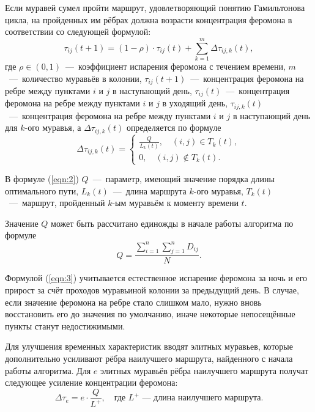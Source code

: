 Если муравей сумел пройти маршрут, удовлетворяющий понятию Гамильтонова цикла, на пройденных им рёбрах должна возрасти концентрация феромона в соответствии со следующей формулой:
\begin{equation} \label{eqn:3}
	\tau_{ij}(t + 1) = (1 - \rho) \cdot \tau_{ij}(t) + \sum_{k=1}^m \Delta\tau_{ij,k}(t),
\end{equation}
где $\rho \in (0,1)$~---~коэффициент испарения феромона с течением времени, $m$~---~количество муравьёв в колонии, $\tau_{ij}(t + 1)$~---~концентрация феромона на ребре между пунктами $i$ и $j$ в наступающий день, $\tau_{ij}(t)$~---~концентрация феромона на ребре между пунктами $i$ и $j$ в уходящий день, $\tau_{ij,k}(t)$~---~концентрация феромона на ребре между пунктами $i$ и $j$ в наступающий день для $k$-ого муравья, а $\Delta\tau_{ij,k}(t)$ определяется по формуле \begin{equation}\label{eqn:2}
	\Delta\tau_{ij,k}(t) = \begin{cases}
		\frac{Q}{L_k(t)}, \quad (i,j) \in T_k(t), \\
		0, \quad (i,j) \notin T_k(t).
	\end{cases}
\end{equation}

В формуле (\ref{eqn:2}) $Q$~---~параметр, имеющий значение порядка длины оптимального пути, $L_k(t)$~---~длина маршрута $k$-ого муравья, $T_k(t)$~---~маршрут, пройденный $k$-ым муравьём к моменту времени $t$. 

Значение $Q$ может быть рассчитано единожды в начале работы алгоритма по формуле \begin{equation}
	Q = \frac{\sum_{i=1}^n \sum_{j=1}^n D_{ij}}{N}.
\end{equation}

Формулой (\ref{eqn:3}) учитывается естественное испарение феромона за ночь и его прирост за счёт проходов муравьиной колонии за предыдущий день. В случае, если значение феромона на ребре стало слишком мало, нужно вновь восстановить его до значения по умолчанию, иначе некоторые непосещённые пункты станут недостижимыми.

Для улучшения временных характеристик вводят элитных муравьев, которые дополнительно усиливают рёбра наилучшего маршрута, найденного с начала работы алгоритма. Для $e$ элитных муравьёв рёбра наилучшего маршрута получат следующее усиление концентрации феромона: \begin{equation}
	\Delta\tau_{e} = e \cdot \frac{Q}{L^+}, \quad \text{где $L^+$~---~длина наилучшего маршрута.}
\end{equation}


